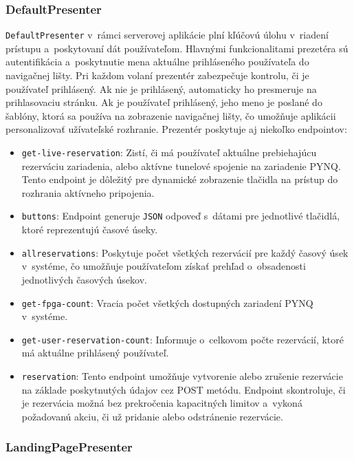 \subsubsection*{DefaultPresenter}

\verb|DefaultPresenter| v~rámci serverovej aplikácie plní kľúčovú úlohu v~riadení prístupu a~poskytovaní dát používateľom. Hlavnými funkcionalitami prezetéra sú autentifikácia a~poskytnutie mena aktuálne prihláseného používateľa do navigačnej lišty. Pri každom volaní prezentér zabezpečuje kontrolu, či je používateľ prihlásený. Ak nie je prihlásený, automaticky ho presmeruje na prihlasovaciu stránku. Ak je používateľ prihlásený, jeho meno je poslané do šablóny, ktorá sa používa na zobrazenie navigačnej lišty, čo umožňuje aplikácii personalizovať užívateľské rozhranie. Prezentér poskytuje aj niekoľko endpointov: 

\begin{itemize}
    \item \verb|get-live-reservation|: Zistí, či má používateľ aktuálne prebiehajúcu rezerváciu zariadenia, alebo aktívne tunelové spojenie na zariadenie PYNQ. Tento endpoint je dôležitý pre dynamické zobrazenie tlačidla na prístup do rozhrania aktívneho pripojenia.
    \item \verb|buttons|: Endpoint generuje \verb|JSON| odpoveď s~dátami pre jednotlivé tlačidlá, ktoré reprezentujú časové úseky.
    \item \verb|allreservations|: Poskytuje počet všetkých rezervácií pre každý časový úsek v~systéme, čo umožňuje používateľom získať prehľad o~obsadenosti jednotlivých časových úsekov.
    \item \verb|get-fpga-count|: Vracia počet všetkých dostupných zariadení PYNQ v~systéme.
    \item \verb|get-user-reservation-count|: Informuje o~celkovom počte rezervácií, ktoré má aktuálne prihlásený používateľ.
    \item \verb|reservation|: Tento endpoint umožňuje vytvorenie alebo zrušenie rezervácie na základe poskytnutých údajov cez POST metódu. Endpoint skontroluje, či je rezervácia možná bez prekročenia kapacitných limitov a~vykoná požadovanú akciu, či už pridanie alebo odstránenie rezervácie.
    
\end{itemize}

\subsubsection*{LandingPagePresenter}

